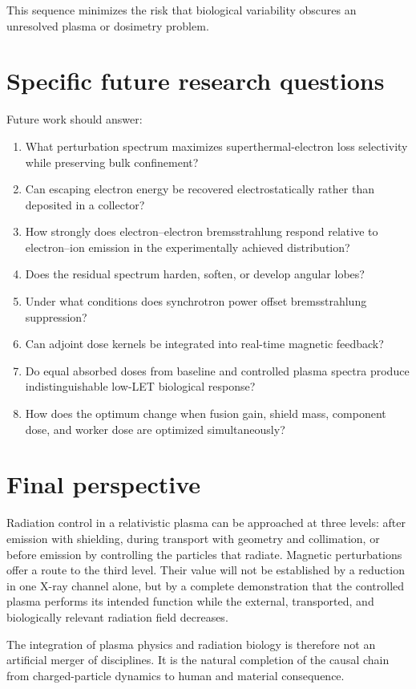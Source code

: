 This sequence minimizes the risk that biological variability obscures an unresolved plasma or dosimetry problem.

\section{Specific future research questions}

Future work should answer:
\begin{enumerate}
\item What perturbation spectrum maximizes superthermal-electron loss selectivity while preserving bulk confinement?
\item Can escaping electron energy be recovered electrostatically rather than deposited in a collector?
\item How strongly does electron--electron bremsstrahlung respond relative to electron--ion emission in the experimentally achieved distribution?
\item Does the residual spectrum harden, soften, or develop angular lobes?
\item Under what conditions does synchrotron power offset bremsstrahlung suppression?
\item Can adjoint dose kernels be integrated into real-time magnetic feedback?
\item Do equal absorbed doses from baseline and controlled plasma spectra produce indistinguishable low-LET biological response?
\item How does the optimum change when fusion gain, shield mass, component dose, and worker dose are optimized simultaneously?
\end{enumerate}

\section{Final perspective}

Radiation control in a relativistic plasma can be approached at three levels: after emission with shielding, during transport with geometry and collimation, or before emission by controlling the particles that radiate. Magnetic perturbations offer a route to the third level. Their value will not be established by a reduction in one X-ray channel alone, but by a complete demonstration that the controlled plasma performs its intended function while the external, transported, and biologically relevant radiation field decreases.

The integration of plasma physics and radiation biology is therefore not an artificial merger of disciplines. It is the natural completion of the causal chain from charged-particle dynamics to human and material consequence.
